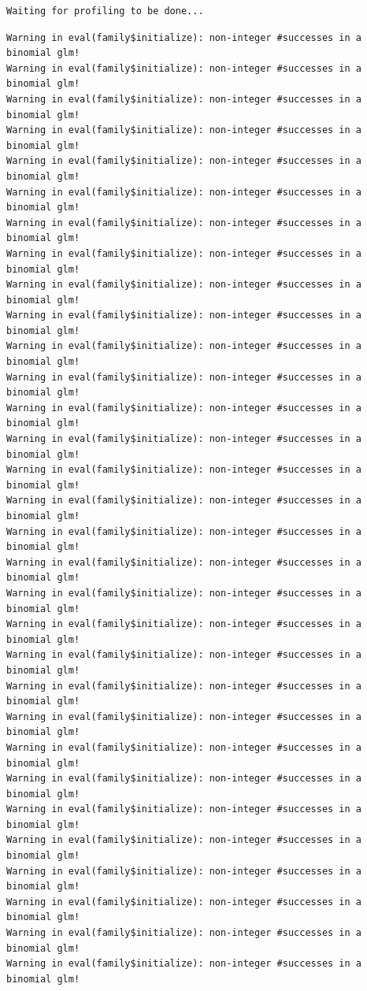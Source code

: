 \documentclass[
  letterpaper,
  DIV=11,
  numbers=noendperiod]{scrartcl}
\begin{document}
\begin{verbatim}
Waiting for profiling to be done...
\end{verbatim}

\begin{verbatim}
Warning in eval(family$initialize): non-integer #successes in a binomial glm!
Warning in eval(family$initialize): non-integer #successes in a binomial glm!
Warning in eval(family$initialize): non-integer #successes in a binomial glm!
Warning in eval(family$initialize): non-integer #successes in a binomial glm!
Warning in eval(family$initialize): non-integer #successes in a binomial glm!
Warning in eval(family$initialize): non-integer #successes in a binomial glm!
Warning in eval(family$initialize): non-integer #successes in a binomial glm!
Warning in eval(family$initialize): non-integer #successes in a binomial glm!
Warning in eval(family$initialize): non-integer #successes in a binomial glm!
Warning in eval(family$initialize): non-integer #successes in a binomial glm!
Warning in eval(family$initialize): non-integer #successes in a binomial glm!
Warning in eval(family$initialize): non-integer #successes in a binomial glm!
Warning in eval(family$initialize): non-integer #successes in a binomial glm!
Warning in eval(family$initialize): non-integer #successes in a binomial glm!
Warning in eval(family$initialize): non-integer #successes in a binomial glm!
Warning in eval(family$initialize): non-integer #successes in a binomial glm!
Warning in eval(family$initialize): non-integer #successes in a binomial glm!
Warning in eval(family$initialize): non-integer #successes in a binomial glm!
Warning in eval(family$initialize): non-integer #successes in a binomial glm!
Warning in eval(family$initialize): non-integer #successes in a binomial glm!
Warning in eval(family$initialize): non-integer #successes in a binomial glm!
Warning in eval(family$initialize): non-integer #successes in a binomial glm!
Warning in eval(family$initialize): non-integer #successes in a binomial glm!
Warning in eval(family$initialize): non-integer #successes in a binomial glm!
Warning in eval(family$initialize): non-integer #successes in a binomial glm!
Warning in eval(family$initialize): non-integer #successes in a binomial glm!
Warning in eval(family$initialize): non-integer #successes in a binomial glm!
Warning in eval(family$initialize): non-integer #successes in a binomial glm!
Warning in eval(family$initialize): non-integer #successes in a binomial glm!
Warning in eval(family$initialize): non-integer #successes in a binomial glm!
Warning in eval(family$initialize): non-integer #successes in a binomial glm!

\end{verbatim}
\end{document}
